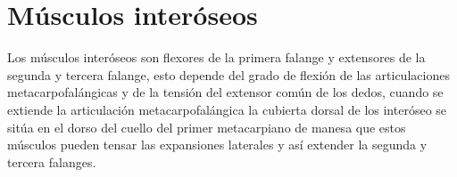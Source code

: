 \documentclass{article}
\begin{document}
\section{Músculos interóseos}
Los músculos interóseos son flexores de la primera falange y extensores de la segunda y tercera falange, esto depende del grado de flexión de las articulaciones metacarpofalángicas y de la tensión del extensor común de los dedos, cuando se extiende la articulación metacarpofalángica la cubierta dorsal de los interóseo se sitúa en el dorso del cuello del primer metacarpiano de manesa que estos músculos pueden tensar las expansiones laterales y así extender la segunda y tercera falanges.\\
\\





\end{document}
